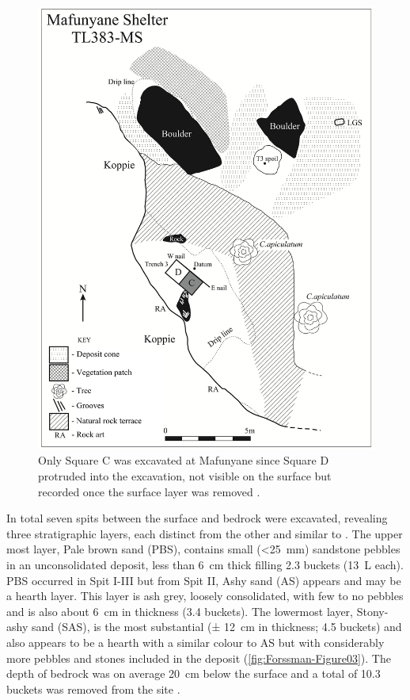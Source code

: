 \documentclass{ijsra}
\begin{document}
	\begin{figure}
		\includegraphics[width=\linewidth]{figures/Forssman-Figure02}
		\caption{Only Square C was excavated at Mafunyane since Square D protruded into the \textcite{Walker_1994} excavation, not visible on the surface but recorded once the surface layer was removed \parencite[from][96]{Forssman_2014a}.}
		\label{fig:Forssman-Figure02}
	\end{figure}

In total seven spits between the surface and bedrock were excavated, revealing three stratigraphic layers, each distinct from the other and similar to \textcite{Walker_1994}. 
The upper most layer, Pale brown sand (PBS), contains small (<\SI{25}{\milli\meter}) sandstone pebbles in an unconsolidated deposit,
 less than \SI{6}{\centi\meter} thick filling \num{2,3} buckets (\SI{13}{\liter} each). 
PBS occurred in Spit I-III but from Spit II, Ashy sand (AS) appears and may be a hearth layer. 
This layer is ash grey, loosely consolidated, with few to no pebbles and is also about \SI{6}{\centi\meter} in thickness (\num{3.4} buckets). 
The lowermost layer, Stony-ashy sand (SAS), is the most substantial (± \SI{12}{\centi\meter} in thickness; \num{4.5} buckets) and also appears to be a hearth with a similar colour to AS but with considerably more pebbles and stones included in the deposit (\cref{fig:Forssman-Figure03}). The depth of bedrock was on average \SI{20}{\centi\meter} below the surface and a total of \num{10.3} buckets was removed from the site \parencite[for more details see][95]{Forssman_2014a}. 
\end{document}
